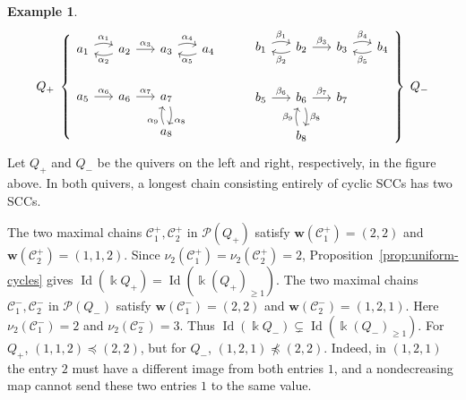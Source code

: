 \documentclass[11pt,reqno]{amsart}
\newcommand{\kk}{\Bbbk}
\newcommand{\Id}{\operatorname{Id}}
\theoremstyle{definition}
\newtheorem{example}[theorem]{Example}
\theoremstyle{remark}
\numberwithin{equation}{section}
\begin{document}
\begin{example}\label{ex:equal-size-capacity}
\[
Q_+\;
\left\{
\begin{gathered}
\begin{tikzcd}[
  ampersand replacement=\&,
  column sep=1.5em,
  row sep=1.5em
]
a_1 \arrow[r,bend left=20,"\alpha_1"]
\& a_2 \arrow[l,bend left=20,"\alpha_2"]
        \arrow[r,"\alpha_3"]
\& a_3 \arrow[r,bend left=20,"\alpha_4"]
\& a_4 \arrow[l,bend left=20,"\alpha_5"]
\\[1em]
a_5 \arrow[r,"\alpha_6"]
\& a_6 \arrow[r,"\alpha_7"]
\& a_7 \arrow[d,bend left=20,"\alpha_8"]
\&
\\
\& \& a_8 \arrow[u,bend left=20,"\alpha_9"] \&
\end{tikzcd}
\end{gathered}
\right.
\qquad
\left.
\begin{gathered}
\begin{tikzcd}[
  ampersand replacement=\&,
  column sep=1.5em,
  row sep=1.5em
]
b_1 \arrow[r,bend left=20,"\beta_1"]
\& b_2 \arrow[l,bend left=20,"\beta_2"]
        \arrow[r,"\beta_3"]
\& b_3 \arrow[r,bend left=20,"\beta_4"]
\& b_4 \arrow[l,bend left=20,"\beta_5"]
\\[1em]
b_5 \arrow[r,"\beta_6"]
\& b_6 \arrow[r,"\beta_7"]
        \arrow[d,bend left=20,"\beta_8"]
\& b_7
\&
\\
\& b_8 \arrow[u,bend left=20,"\beta_9"] \& \&
\end{tikzcd}
\end{gathered}
\right\}
\;Q_-
\]
Let $Q_+$ and $Q_-$ be the quivers on the left and right,
respectively, in the figure above.
In both quivers, a longest chain consisting entirely
of cyclic SCCs has two SCCs.

The two maximal chains $\mathcal C_1^+,\mathcal C_2^+$
in $\mathcal P(Q_+)$ satisfy
$\mathbf w(\mathcal C_1^+)=(2,2)$ and
$\mathbf w(\mathcal C_2^+)=(1,1,2)$.
Since $\nu_2(\mathcal C_1^+)=\nu_2(\mathcal C_2^+)=2$,
Proposition~\ref{prop:uniform-cycles} gives
$\Id(\kk Q_+)=\Id(\kk(Q_+)_{\ge1})$.
The two maximal chains $\mathcal C_1^-,\mathcal C_2^-$
in $\mathcal P(Q_-)$ satisfy
$\mathbf w(\mathcal C_1^-)=(2,2)$ and
$\mathbf w(\mathcal C_2^-)=(1,2,1)$.
Here $\nu_2(\mathcal C_1^-)=2$ and
$\nu_2(\mathcal C_2^-)=3$.
Thus $\Id(\kk Q_-)\subsetneq\Id(\kk(Q_-)_{\ge1})$.
For $Q_+$, $(1,1,2)\preceq(2,2)$,
but for $Q_-$, $(1,2,1)\npreceq(2,2)$.
Indeed, in $(1,2,1)$ the entry $2$ must have
a different image from both entries $1$, and a nondecreasing
map cannot send these two entries $1$ to the same value.
\end{example}
\end{document}
